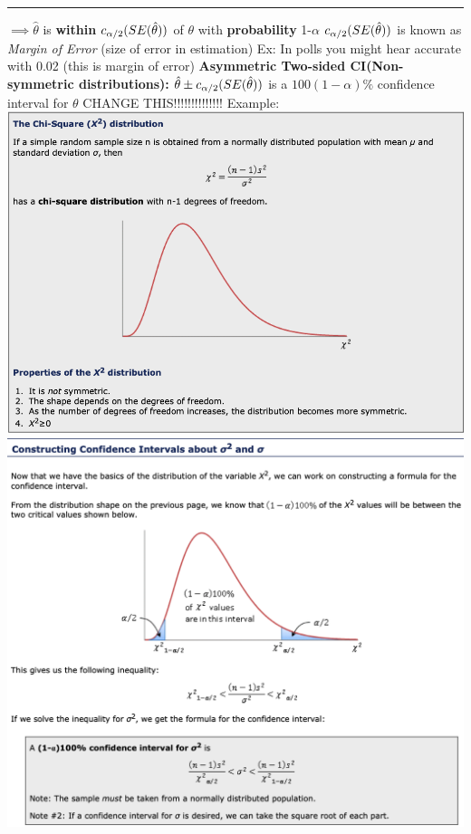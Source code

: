 \documentclass[]{article}
\begin{document}
\newline
\newline\Large\rule{4.3cm}{0pt} $\implies \hat\theta$ is \textbf{within} $c_{\alpha \\/ 2} (SE(\hat\theta))$ of $\theta$ with \textbf{probability}  1-$\alpha$
\newline
\newline $c_{\alpha \\/ 2} (SE(\hat\theta))$ is known as \textit{Margin of Error} (size of error in estimation)
\newline Ex: In polls you might hear accurate with 0.02 (this is margin of error)
\newline
\newline\Large\textbf{Asymmetric Two-sided CI(Non-symmetric distributions):}
\newline $ \hat\theta \pm c_{\alpha \\/ 2}(SE(\hat\theta))$ is a $100(1-\alpha)\%$ confidence interval for $\theta$ CHANGE THIS!!!!!!!!!!!!!!
\newline
\newline Example:
\newline\includegraphics[scale=0.5]{chi_square_distribution}
\newline\includegraphics[scale=0.53]{ci_chi_square_distribution}

 
\section{}
\end{document}
